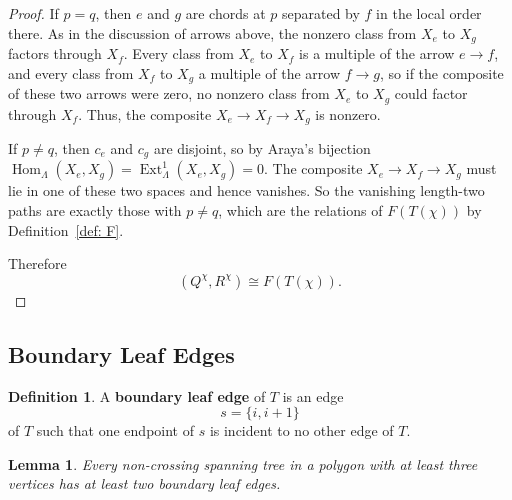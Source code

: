 \documentclass[12pt]{amsart}
\newtheorem{lem}[thm]{Lemma}
\theoremstyle{definition}
\newtheorem{defn}[thm]{Definition}
\theoremstyle{remark}
\numberwithin{equation}{section}
\DeclareMathOperator{\Hom}{Hom}%
\DeclareMathOperator{\Ext}{Ext}%
\begin{document}
\begin{proof}
If $p = q$, then $e$ and $g$ are chords at $p$ separated by $f$ in the local order there. As in the discussion of arrows above, the nonzero class from $X_e$ to $X_g$ factors through $X_f$. Every class from $X_e$ to $X_f$ is a multiple of the arrow $e \to f$, and every class from $X_f$ to $X_g$ a multiple of the arrow $f \to g$, so if the composite of these two arrows were zero, no nonzero class from $X_e$ to $X_g$ could factor through $X_f$. Thus, the composite $X_e \to X_f \to X_g$ is nonzero.

If $p \neq q$, then $c_e$ and $c_g$ are disjoint, so by Araya's bijection $\Hom_\Lambda(X_e,X_g) = \Ext^1_\Lambda(X_e,X_g) = 0$. The composite $X_e \to X_f \to X_g$ must lie in one of these two spaces and hence vanishes. So the vanishing length-two paths are exactly those with $p \neq q$, which are the relations of $F(T(\chi))$ by Definition~\ref{def: F}.

Therefore
\[
(Q^\chi,R^\chi) \cong F(T(\chi)).
\]
\end{proof}

\subsection{Boundary Leaf Edges}

\begin{defn}
A \textbf{boundary leaf edge} of \(T\) is an edge
\[
s=\{i,i+1\}
\]
of \(T\) such that one endpoint of \(s\) is incident to no other edge of \(T\).
\label{defn: boundary leaf edge}
\end{defn}

\begin{lem}\label{lem:boundary-leaf-exists}
Every non-crossing spanning tree in a polygon with at least three vertices has at least two boundary leaf edges.
\end{lem}
\end{document}
